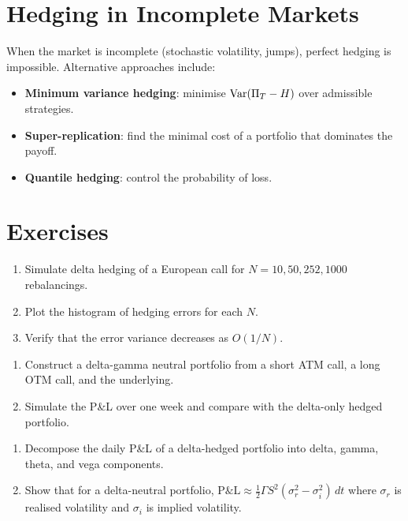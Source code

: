 \section{Hedging in Incomplete Markets}

\begin{remark}
When the market is incomplete (stochastic volatility, jumps), perfect
hedging is impossible. Alternative approaches include:
\begin{itemize}
    \item \textbf{Minimum variance hedging}: minimise $\mathrm{Var}(\Pi_T - H)$
          over admissible strategies.
    \item \textbf{Super-replication}: find the minimal cost of a portfolio
          that dominates the payoff.
    \item \textbf{Quantile hedging}: control the probability of loss.
\end{itemize}
\end{remark}

\section{Exercises}

\begin{exercise}
\begin{enumerate}
    \item Simulate delta hedging of a European call for
          $N = 10, 50, 252, 1000$ rebalancings.
    \item Plot the histogram of hedging errors for each $N$.
    \item Verify that the error variance decreases as $O(1/N)$.
\end{enumerate}
\end{exercise}

\begin{exercise}
\begin{enumerate}
    \item Construct a delta-gamma neutral portfolio from a short ATM call,
          a long OTM call, and the underlying.
    \item Simulate the P\&L over one week and compare with the delta-only
          hedged portfolio.
\end{enumerate}
\end{exercise}

\begin{exercise}[P\&L Analysis]
\begin{enumerate}
    \item Decompose the daily P\&L of a delta-hedged portfolio into delta,
          gamma, theta, and vega components.
    \item Show that for a delta-neutral portfolio,
          $\text{P\&L} \approx \frac{1}{2}\Gamma S^2(\sigma_r^2 - \sigma_i^2)\,dt$
          where $\sigma_r$ is realised volatility and $\sigma_i$ is implied
          volatility.
\end{enumerate}
\end{exercise}


